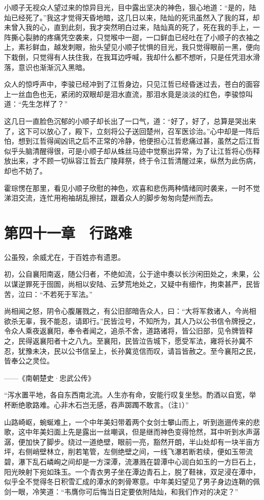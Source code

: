 小顺子无视众人望过来的惊异目光，目中露出坚决的神色，狠心地道：“是的，陆灿已经死了。”我这才觉得天昏地暗，这几日以来，陆灿的死讯虽然入了我的耳，却未曾入我的心，直到此刻，我才突然明白过来，陆灿真的死了，死在我的手上，一阵撕心裂肺的疼痛凭空袭来，只觉喉中一甜，一口鲜血已经吐在了小顺子的衣袖之上，素衫鲜血，越发刺眼，抬头望见小顺子忧惧的目光，我只觉得眼前一黑，便向下栽倒，只觉得有人扶住我，在我耳边呼喊，我却什么都不想听，只是任凭泪水滑落，意识也渐渐沉入黑暗。

众人的惊呼声中，李骏已经冲到了江哲身边，只见江哲已经昏迷过去，苍白的面容上一丝血色也无，紧闭的双眼却是泪水直流，那泪水竟是淡淡的红色，李骏惊叫道：“先生怎样了？”

这几日一直脸色沉郁的小顺子却长出了一口气，道：“好了，好了，总算是哭出来了，这下可以放心了，殿下，立刻将公子送回楚州，召军医诊治。”心中却是一阵后怕，想到江哲得闻凶讯之后不正常的冷静，他便担心江哲悲痛过甚，虽然之后江哲似乎头脑清醒得很，可是小顺子却从蛛丝马迹中觉察出异常，为了让江哲将心伤释放出来，才不顾一切纵容江哲去广陵拜祭，终于令江哲清醒过来，纵然为此伤病，却也不妨了。

霍琮愣在那里，看见小顺子欣慰的神色，欢喜和悲伤两种情绪同时袭来，一时不觉涕泪交流，连忙用袍袖胡乱擦拭，跟着众人的脚步匆匆向楚州而去。

\chapter{第四十一章　行路难}

公虽殁，余威尤在，于百姓亦有遗恩。

初，公自襄阳南返，随公归者，不绝如流，公于途中奏以长沙闲田处之，未果，公以谋逆罪死于囹圄，尚相以安陆、云梦荒地处之，又疑中有细作，拘束甚严，民皆苦，泣曰：“不若死于军法。”

尚相闻之怒，阴令心腹屠戮之，有公旧部暗告众人，曰：“大将军救诸人，今尚相欲杀无辜，我不能忍，请即行。”民皆泣号，不知所为，其人乃以公书信令牌授之，令众人乘夜返襄阳，奉令者闻之，追杀不舍，道路诸将，皆公旧部，见令牌皆释之，民得返襄阳者十之八九。至襄阳，民皆泣告城下，愿受军法，雍将长孙冀不忍，犹豫未决，民以公书信呈上，长孙冀览信而叹，请旨皆赦之。至今襄阳之民，皆奉公之灵位。

——《南朝楚史·忠武公传》

“泻水置平地，各自东西南北流。人生亦有命，安能行叹复坐愁。酌酒以自宽，举杯断绝歌路难。心非木石岂无感，吞声踯躅不敢言。（注1）”

山路崎岖，蜿蜒难上，一个中年美妇带着两个女剑士攀山而上，听到迤逦传来的悲歌，这中年美妇面上先是露出一丝嘲讽，但是继而神色变得怆然，耳中听到水声潺潺，便加快了脚步。绕过一道绝壁，眼前一亮，豁然开朗，半山处却有一块半亩方坪，右侧峭壁林立，削若笔管，左侧绝壁之间，一线飞瀑若断若续，便如玉带流碧，瀑下乱石嶙峋之间却是一方深潭，流瀑溅在碧潭中心润白如玉的一方巨石上，阳光映射下宛如珠玉。一个青衣男子坐在潭边青石上，脱了鞋袜，双足浸在潭中，似乎全不觉得冬日积雪汇成的潭水的刺骨寒意。中年美妇望见了男子身边连鞘的佩剑一眼，冷笑道：“韦膺你可后悔当日定要依附陆灿，和我们作对的决定？”


